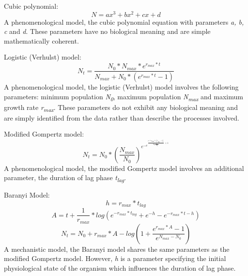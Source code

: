 \documentclass[11pt, a4paper, titlepage]{article}
\begin{document}
Cubic polynomial:
\begin{equation}
    N = ax^3 + bx^2 + cx + d
\end{equation}
\noindent
A phenomenological model, the cubic polynomial equation with parameters \emph{a, b, c} and \emph{d}. These parameters have no biological meaning and are simple mathematically coherent.

Logistic (Verhulst) model:
\begin{equation}
    N_{t} = \frac{N_{0} * N_{max} * e^{r_{max} * t}} {N_{max} + N_{0} * (e^{r_{max} * t} - 1)}
\end{equation}
\noindent
A phenomenological model, the logistic (Verhulst) model involves the following parameters: minimum population \emph{N\textsubscript{0}}, maximum population \emph{N\textsubscript{max}} and maximum growth rate \emph{r\textsubscript{max}}. These parameters do not exhibit any biological meaning and are simply identified from the data rather than describe the processes involved.

Modified Gompertz model:
\begin{equation}
    N_{t} = N_{0} * (\frac{N_{max}}{N_{0}}) ^ {e ^ {-e ^ {\frac{e ^1 * r_{max} * (t_{lag} - t)}{log\frac{N_{max}}{N_{0}}} + 1}}}
\end{equation}
\noindent
A phenomenological model, the modified Gompertz model involves an additional parameter, the duration of lag phase \emph{t\textsubscript{lag}}.

Baranyi Model:
\begin{equation}
    h = r_{max} * t_{lag}
\end{equation}
\begin{equation}
    A = t + \frac{1}{r_{max}} * log({e ^ {-r_{max} * t_{lag}} + e ^ {-h} - e ^ {-r_{max} * t - h}})
\end{equation}
\begin{equation}
    N_{t} = N_{0} + r_{max} * A - log(1 + \frac{{e ^ {r_{max} * A} - 1}}{e^{N_{max} - N_{0}}})
\end{equation}
\noindent
A mechanistic model, the Baranyi model shares the same parameters as the modified Gompertz model. However, \emph{h} is a parameter specifying the initial physiological state of the organism which influences the duration of lag phase.
\end{document}
